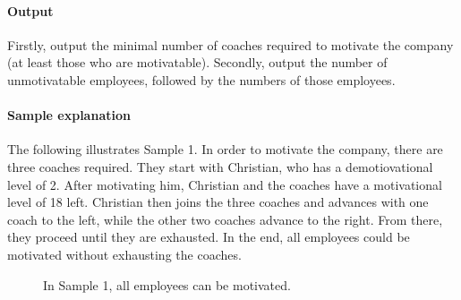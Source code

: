 \paragraph*{Output}

Firstly, output the minimal number of coaches required to motivate the company (at least those who are motivatable).
Secondly, output the number of unmotivatable employees, followed by the numbers of those employees.

\paragraph*{Sample explanation}

The following illustrates Sample 1. In order to motivate the company, there are three coaches
required. They start with Christian, who has a demotiovational level of 2. After motivating him,
Christian and the coaches have a motivational level of 18 left. Christian then joins the three 
coaches and advances with one coach to the left, while the other two coaches advance to the right. 
From there, they proceed until they are exhausted. In the end, all employees could be motivated
without exhausting the coaches.

\begin{figure}[h!]
  \centering

  \caption{In Sample 1, all employees can be motivated.}
\end{figure}


\begin{samples}
\end{samples}


